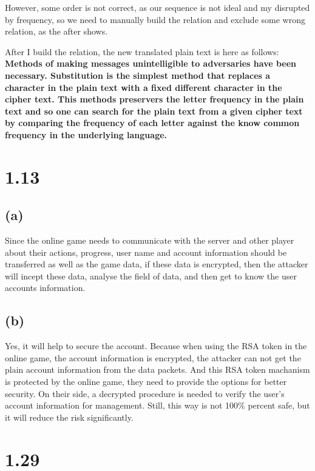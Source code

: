 \documentclass{article}
\begin{document}
However, some order is not correct, as our sequence is not ideal and my disrupted by frequency, so we need to manually
build the relation and exclude some wrong relation, as the after shows.

After I build the relation, the new translated plain text is here as follows:
\textbf{Methods of making messages unintelligible to adversaries have been necessary.
Substitution is the simplest method that replaces a character in the plain text 
with a fixed different character in the cipher text. This methods preservers 
the letter frequency in the plain text and so one can search for the plain text
from a given cipher text by comparing the frequency of each letter against 
the know common frequency in the underlying language.}

\section{1.13}

\subsection{(a)}

Since the online game needs to communicate with the server and other player about their actions, progress, user name and account
information should be transferred as well as the game data, if these data is encrypted, then the attacker will incept these data,
analyse the field of data, and then get to know the user accounts information.

\subsection{(b)}

Yes, it will help to secure the account. Because when using the RSA token in the online game, the account information is encrypted,
the attacker can not get the plain account information from the data packets.
And this RSA token machanism is protected by the online game, they need to provide the options for better security. On their side,
a decrypted procedure is needed to verify the user's account information for management.
Still, this way is not 100\% percent safe, but it will reduce the risk significantly.

\section{1.29}
\end{document}
